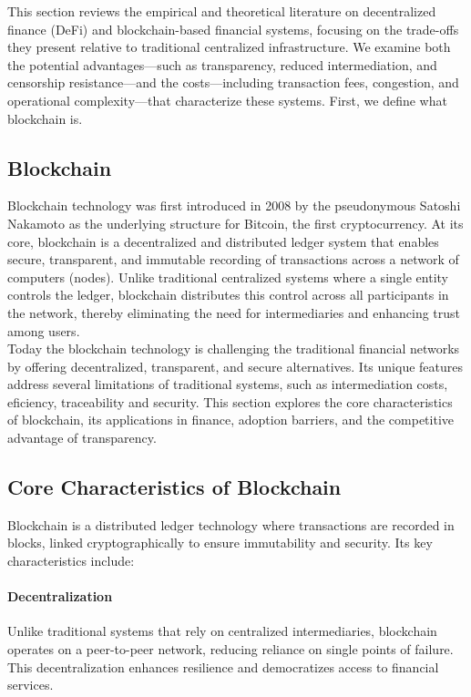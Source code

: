 This section reviews the empirical and theoretical literature on decentralized finance (DeFi) and blockchain-based financial systems, focusing on the trade-offs they present relative to traditional centralized infrastructure. We examine both the potential advantages—such as transparency, reduced intermediation, and censorship resistance—and the costs—including transaction fees, congestion, and operational complexity—that characterize these systems. First, we define what blockchain is.

\subsection{Blockchain}
Blockchain technology was first introduced in 2008 by the pseudonymous Satoshi Nakamoto as the underlying structure for Bitcoin, the first cryptocurrency. At its core, blockchain is a decentralized and distributed ledger system that enables secure, transparent, and immutable recording of transactions across a network of computers (nodes). Unlike traditional centralized systems where a single entity controls the ledger, blockchain distributes this control across all participants in the network, thereby eliminating the need for intermediaries and enhancing trust among users. \cite{nakamoto_bitcoin_2008} \\ 

Today the blockchain technology is challenging the traditional financial networks by offering decentralized, transparent, and secure alternatives. Its unique features address several limitations of traditional systems, such as intermediation costs, eficiency, traceability and security. This section explores the core characteristics of blockchain, its applications in finance, adoption barriers, and the competitive advantage of transparency.

\subsection{Core Characteristics of Blockchain}

Blockchain is a distributed ledger technology where transactions are recorded in blocks, linked cryptographically to ensure immutability and security. Its key characteristics include:

\paragraph{Decentralization}
Unlike traditional systems that rely on centralized intermediaries, blockchain operates on a peer-to-peer network, reducing reliance on single points of failure. This decentralization enhances resilience and democratizes access to financial services. \cite{morhaim_blockchain_2019}

